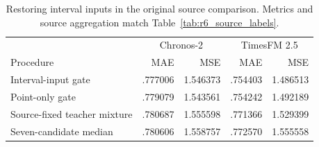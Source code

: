 \begin{table}[ht]
\centering
\small
\caption{Restoring interval inputs in the original source comparison. Metrics and source aggregation match Table~\ref{tab:r6_source_labels}.}
\label{tab:r6_interval_inputs}
\begin{tabular}{lrrrr}
\toprule
 & \multicolumn{2}{c}{Chronos-2} & \multicolumn{2}{c}{TimesFM 2.5}\\
Procedure & MAE & MSE & MAE & MSE\\
\midrule
Interval-input gate & .777006 & 1.546373 & .754403 & 1.486513\\
Point-only gate & .779079 & 1.543561 & .754242 & 1.492189\\
Source-fixed teacher mixture & .780687 & 1.555598 & .771366 & 1.529399\\
Seven-candidate median & .780606 & 1.558757 & .772570 & 1.555558\\
\bottomrule
\end{tabular}
\end{table}
